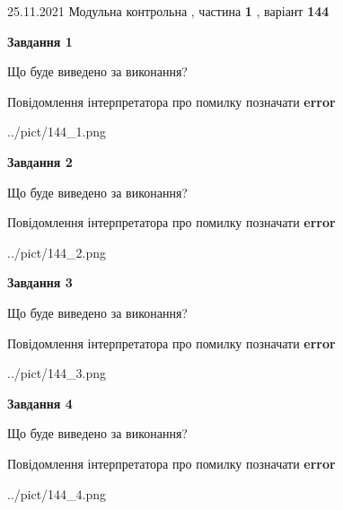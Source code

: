 \documentclass[10pt, ukrainian]{article}
\begin{document}
{25.11.2021 Модульна контрольна , частина \textbf { 1 }, варіант  \No \textbf { 144 }\par}
{
\begin {large}

{\begin {center}\textbf{Завдання 1}\end {center}}\par
Що буде виведено за виконання? \par
Повідомлення інтерпретатора про помилку позначати \textbf{error}

\begin{center}
	{../pict/144_1.png}
\end{center}
\newpage

{\begin {center}\textbf{Завдання 2}\end {center}}\par
Що буде виведено за виконання? \par
Повідомлення інтерпретатора про помилку позначати \textbf{error}

\begin{center}
	{../pict/144_2.png}
\end{center}
\newpage

{\begin {center}\textbf{Завдання 3}\end {center}}\par
Що буде виведено за виконання? \par
Повідомлення інтерпретатора про помилку позначати \textbf{error}

\begin{center}
	{../pict/144_3.png}
\end{center}
\newpage

{\begin {center}\textbf{Завдання 4}\end {center}}\par
Що буде виведено за виконання? \par
Повідомлення інтерпретатора про помилку позначати \textbf{error}

\begin{center}
	{../pict/144_4.png}
\end{center}
\newpage


\end{large}}
\end{document}
